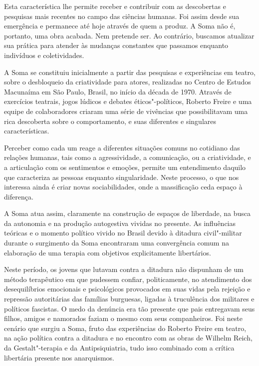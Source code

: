 Esta característica lhe permite receber e contribuir com as descobertas
e pesquisas mais recentes no campo das ciências humanas. Foi assim desde
sua emergência e permanece até hoje através de quem a produz. A Soma não
é, portanto, uma obra acabada. Nem pretende ser. Ao contrário, buscamos
atualizar sua prática para atender às mudanças constantes que passamos
enquanto indivíduos e coletividades.

A Soma se constituiu inicialmente a partir das pesquisas e experiências
em teatro, sobre o desbloqueio da criatividade para atores, realizadas
no Centro de Estudos Macunaíma em São Paulo, Brasil, no início da década
de 1970. Através de exercícios teatrais, jogos lúdicos e debates
éticos"-políticos, Roberto Freire e uma equipe de colaboradores criaram
uma série de vivências que possibilitavam uma rica descoberta sobre o
comportamento, e suas diferentes e singulares características.

Perceber como cada um reage a diferentes situações comuns no cotidiano
das relações humanas, tais como a agressividade, a comunicação, ou a
criatividade, e a articulação com os sentimentos e emoções, permite um
entendimento daquilo que caracteriza as pessoas enquanto singularidade.
Neste processo, o que nos interessa ainda é criar novas sociabilidades,
onde a massificação ceda espaço à diferença.

A Soma atua assim, claramente na construção de espaços de liberdade, na
busca da autonomia e na produção autogestiva vividas no presente. As
influências teóricas e o momento político vivido no Brasil devido à
ditadura civil"-militar durante o surgimento da Soma encontraram uma
convergência comum na elaboração de uma terapia com objetivos
explicitamente libertários.

Neste período, os jovens que lutavam contra a ditadura não dispunham de
um método terapêutico em que pudessem confiar, politicamente, no
atendimento dos desequilíbrios emocionais e psicológicos provocados em
suas vidas pela rejeição e repressão autoritárias das famílias
burguesas, ligadas à truculência dos militares e políticos fascistas. O
medo da denúncia era tão presente que pais entregavam seus filhos,
amigos e namorados faziam o mesmo com seus companheiros. Foi neste
cenário que surgiu a Soma, fruto das experiências do Roberto Freire
em teatro, na ação política contra a ditadura e no encontro com as obras
de Wilhelm Reich, da Gestalt"-terapia e da Antipsiquiatria, tudo isso
combinado com a crítica libertária presente nos anarquismos.

